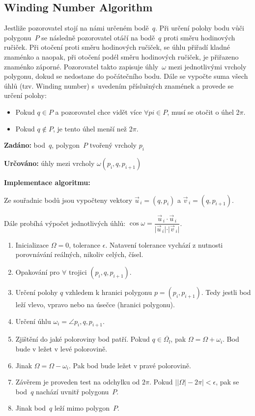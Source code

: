 \documentclass[a4paper, 12pt, oneside, titlepage]{article} %
\begin{document}
\subsection*{Winding Number Algorithm}
Jestliže pozorovatel stojí na námi určeném bodě~$q$. Při určení polohy bodu vůči polygonu~$P$ se následně pozorovatel otáčí na bodě~$q$ proti směru hodinových ručiček. Při otočení proti směru hodinových ručiček, se úhlu přiřadí kladné znaménko a naopak, při otočení podél směru hodinových ručiček, je přiřazeno znaménko záporné. Pozorovatel takto zapisuje úhly~$\omega$ mezi jednotlivými vrcholy polygonu, dokud se nedostane do počátečního bodu. Dále se vypočte suma všech úhlů (tzv. Winding number) s~uvedením příslušných znamének a provede se určení polohy: 
\begin{itemize}
\item Pokud $q \in P$ a pozorovatel chce vidět více $\forall pi \in P$, musí se otočit o úhel 2$\pi$.
\item Pokud $q \notin P$, je tento úhel menší než 2$\pi$.
\end{itemize}


\noindent\textbf{Zadáno:} bod~$q$, polygon~$P$ tvořený vrcholy $p_i$

\noindent\textbf{Určováno:} úhly mezi vrcholy $\omega(p_i,q,p_{i+1} )$

\noindent\textbf{Implementace algoritmu:}

Ze souřadnic bodů jsou vypočteny vektory $\vec{u}_{\,i} = (q,p_i)$ a $\vec{v}_{\,i} = (q,p_{i+1})$. 

Dále probíhá výpočet jednotlivých úhlů: $\cos\omega = \dfrac{\vec{u}_{\,i}\cdot\vec{u}_{\,i}}{\vert\vec{u}_{\,i}\vert\cdot\vert\vec{v}_{\,i}\vert}$.

\begin{enumerate}
  \item Inicializace $\Omega = 0$, tolerance $\epsilon$. Natavení tolerance vychází z nutnosti porovnávání reálných, nikoliv celých, čísel.
  \item Opakování pro $\forall$ trojici $(p_i,q,p_{i+1} )$.
  \item \quad Určení polohy $q$ vzhledem k hranici polygonu $p = (p_i, p_{i+1})$. Tedy jestli bod leží vlevo, vpravo nebo na úsečce (hranici polygonu).
  \item \quad Určení úhlu $\omega_i = \angle p_i,q, p_{i+1}$.
  \item \quad Zjištění do jaké poloroviny bod patří. Pokud $q \in \overline{\Omega_l}$, pak $\Omega = \Omega + \omega_i$. Bod bude v ležet v levé polorovině.
  \item \quad Jinak $\Omega = \Omega - \omega_i$. Pak bod bude ležet v pravé polorovině. 
  \item Závěrem je proveden test na odchylku od $2\pi$. Pokud $\vert\vert\Omega\vert - 2\pi\vert < \epsilon$, pak se bod~$q$ nachází uvnitř polygonu~$P$.
  \item Jinak bod~$q$ leží mimo polygon~$P$.
\end{enumerate}
\end{document}

